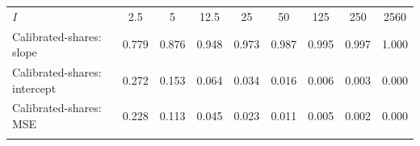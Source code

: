 \begin{tabular}{lcccccccc}
\hline \noalign{\smallskip}\textit{I} & 2.5 & 5 & 12.5 & 25 & 50 & 125 & 250 & 2560\\
\noalign{\smallskip}\hline \noalign{\smallskip}Calibrated-shares: slope & 0.779 & 0.876 & 0.948 & 0.973 & 0.987 & 0.995 & 0.997 & 1.000\\
Calibrated-shares: intercept & 0.272 & 0.153 & 0.064 & 0.034 & 0.016 & 0.006 & 0.003 & 0.000\\
Calibrated-shares: MSE & 0.228 & 0.113 & 0.045 & 0.023 & 0.011 & 0.005 & 0.002 & 0.000\\
\noalign{\smallskip}\hline\end{tabular}
